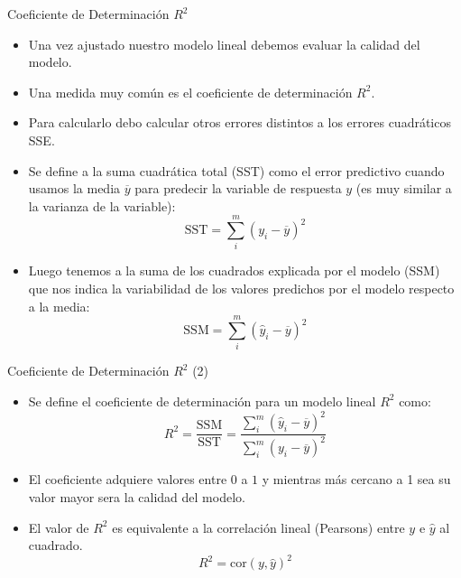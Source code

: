 \documentclass[handout]{beamer}
\begin{document}
\begin{frame}{Coeficiente de Determinación $R^2$}
\scriptsize{
\begin{itemize}
 \item Una vez ajustado nuestro modelo lineal debemos evaluar la calidad del modelo.
 \item Una medida muy común es el coeficiente de determinación $R^2$. 
 \item Para calcularlo debo calcular otros errores distintos a los errores cuadráticos SSE.
 \item Se define a la suma cuadrática total (SST) como el error predictivo cuando usamos la media $\overline{y}$ para predecir la variable de respuesta $y$ (es muy similar a la varianza de la variable):
 \begin{displaymath}
  \text{SST} = \sum_{i}^{m}(y_i-\overline{y})^2  
 \end{displaymath}
 \item Luego tenemos a la suma de los cuadrados explicada por el modelo (SSM) que nos indica la variabilidad de los valores predichos por el modelo respecto a la media:
 \begin{displaymath}
  \text{SSM} = \sum_{i}^{m}(\hat{y}_i-\overline{y})^2 
 \end{displaymath}
  
\end{itemize}

}
\end{frame}

\begin{frame}{Coeficiente de Determinación $R^2$ (2)}
\scriptsize{
\begin{itemize}
 \item Se define el coeficiente de determinación para un modelo lineal $R^2$ como:
 \begin{equation}
  R^2= \frac{\text{SSM}}{\text{SST}} = \frac{\sum_{i}^{m}(\hat{y}_i-\overline{y})^2 }{\sum_{i}^{m}(y_i-\overline{y})^2  }
 \end{equation}

 \item El coeficiente adquiere valores entre $0$ a $1$ y mientras más cercano a 1 sea su valor mayor sera la calidad del modelo.
 
 \item El valor de $R^2$ es equivalente a la correlación lineal (Pearsons) entre $y$ e $\hat{y}$ al cuadrado.
\begin{displaymath}
 R^2=\text{cor}(y,\hat{y})^2
\end{displaymath}
  
\end{itemize}


}
\end{frame}
\end{document}
